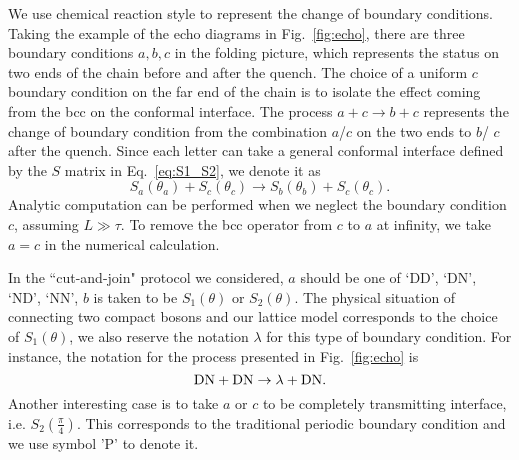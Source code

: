 
We use chemical reaction style to represent the change of boundary conditions. Taking the example of the echo diagrams in Fig.~\ref{fig:echo}, there are three boundary conditions $a,b,c$ in the folding picture, which represents the status on two ends of the chain before and after the quench. The choice of a uniform $c$ boundary condition on the far end of the chain is to isolate the effect coming from the bcc on the conformal interface. The process $a + c \rightarrow b + c$ represents the change of boundary condition from the combination $a$/$c$ on the two ends to $b$/ $c$ after the quench. Since each letter can take a general conformal interface defined by the $S$ matrix in Eq.~\eqref{eq:S1_S2}, we denote it as
\begin{equation}
S_a( \theta_a ) + S_c( \theta_c) \rightarrow S_b( \theta_b )  + S_c( \theta_c ) .
\end{equation}
Analytic computation can be performed when we neglect the boundary condition $c$, assuming $L \gg \tau$. To remove the bcc operator from $c$ to $a$ at infinity, we take $a = c$ in the numerical calculation. 

In the ``cut-and-join" protocol we considered, $a$ should be one of `DD', `DN', `ND', `NN', $b$ is taken to be $S_1( \theta )$ or $S_2( \theta )$. The physical situation of connecting two compact bosons and our lattice model corresponds to the choice of $S_1( \theta)$, we also reserve the notation $\lambda$ for this type of boundary condition. For instance, the notation for the process presented in Fig.~\ref{fig:echo} is
\begin{equation}
{\rm DN }  + {\rm DN} \rightarrow \lambda + { \rm DN} .
\end{equation}
Another interesting case is to take $a$ or $c$ to be completely transmitting interface, i.e. $S_2( \frac{\pi}{4} )$. This corresponds to the traditional periodic boundary condition and we use symbol 'P' to denote it. 


